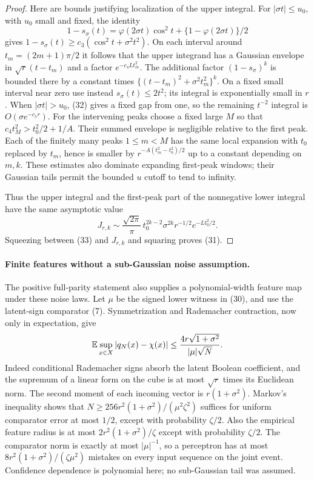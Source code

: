 \begin{proof}
Here are bounds justifying localization of the upper integral. For
$|\sigma t|\le u_0$, with $u_0$ small and fixed, the identity
\[
 1-s_\sigma(t)=\varphi(2\sigma t)\cos^2t+
                         \{1-\varphi(2\sigma t)\}/2
\]
gives $1-s_\sigma(t)\ge c_3(\cos^2t+\sigma^2t^2)$.
On each interval around $t_m=(2m+1)\pi/2$ it follows that the upper
integrand has a Gaussian envelope in $\sqrt r(t-t_m)$ and a factor
$e^{-c_4Lt_m^2}$. The additional factor $(1-s_\sigma)^k$ is bounded
there by a constant times $\{(t-t_m)^2+\sigma^2t_m^2\}^k$.
On a fixed small interval near zero use instead
$s_\sigma(t)\le2t^2$; its integral is exponentially small in $r$.
When $|\sigma t|>u_0$, (32) gives a fixed gap from one, so the
remaining $t^{-2}$ integral is $O(\sigma e^{-c_5r})$.
For the intervening peaks choose a fixed large $M$ so that
$c_4t_M^2>t_0^2/2+1/A$. Their summed envelope is negligible relative
to the first peak. Each of the finitely many peaks $1\le m<M$ has
the same local expansion with $t_0$ replaced by $t_m$, hence is smaller
by $r^{-A(t_m^2-t_0^2)/2}$ up to a constant depending on $m,k$.
These estimates also dominate expanding first-peak windows; their
Gaussian tails permit the bounded $u$ cutoff to tend to infinity.

Thus the upper integral and the first-peak part of the nonnegative lower
integral have the same asymptotic value
\[
 J_{r,k}\sim
 \frac{\sqrt{2\pi}}\pi\,t_0^{2k-2}\sigma^{2k}r^{-1/2}
                                      e^{-Lt_0^2/2}.
\]
Squeezing between (33) and $J_{r,k}$ and squaring proves (31).
\end{proof}

\paragraph{Finite features without a sub-Gaussian noise assumption.}
The positive full-parity statement also supplies a polynomial-width
feature map under these noise laws. Let $\mu$ be the signed lower witness
in (30), and use the latent-sign comparator (7). Symmetrization and
Rademacher contraction, now only in expectation, give
\[
 \mathbb E\sup_{x\in X}|q_N(x)-\chi(x)|
       \le\frac{4r\sqrt{1+\sigma^2}}{|\mu|\sqrt N}.
\]
Indeed conditional Rademacher signs absorb the latent Boolean coefficient,
and the supremum of a linear form on the cube is at most $\sqrt r$
times its Euclidean norm. The second moment of each incoming vector is
$r(1+\sigma^2)$. Markov's inequality shows that
$N\ge256r^2(1+\sigma^2)/(\mu^2\zeta^2)$ suffices for uniform
comparator error at most $1/2$, except with probability $\zeta/2$.
Also the empirical feature radius is at most
$2r^2(1+\sigma^2)/\zeta$ except with probability $\zeta/2$.
The comparator norm is exactly at most $|\mu|^{-1}$, so a perceptron
has at most $8r^2(1+\sigma^2)/(\zeta\mu^2)$ mistakes on every input
sequence on the joint event. Confidence dependence is polynomial here;
no sub-Gaussian tail was assumed.

